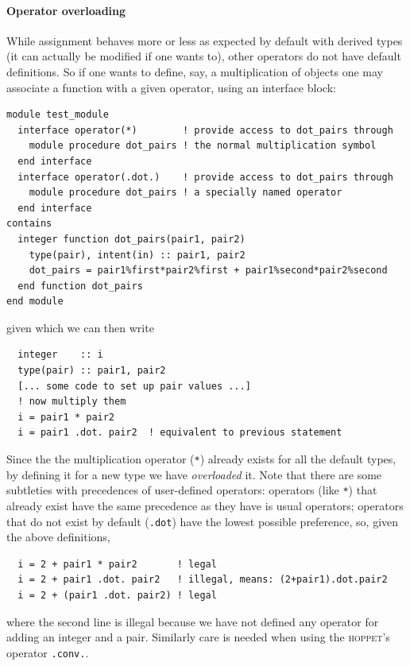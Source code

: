 \documentclass[12pt]{article}
\newcommand{\hoppet}{\textsc{hoppet}\xspace}
\begin{document}
\paragraph{Operator overloading} While assignment behaves more or less
as expected by default with derived types (it can actually be modified
if one wants to), other operators do not have default definitions. So
if one wants to define, say, a multiplication of objects one may
associate a function with a given operator, using an interface block:
\begin{lstlisting}
module test_module
  interface operator(*)        ! provide access to dot_pairs through 
    module procedure dot_pairs ! the normal multiplication symbol
  end interface 
  interface operator(.dot.)    ! provide access to dot_pairs through
    module procedure dot_pairs ! a specially named operator
  end interface 
contains
  integer function dot_pairs(pair1, pair2)
    type(pair), intent(in) :: pair1, pair2
    dot_pairs = pair1%first*pair2%first + pair1%second*pair2%second
  end function dot_pairs
end module
\end{lstlisting}
given which we can then write
\begin{lstlisting}
  integer    :: i
  type(pair) :: pair1, pair2
  [... some code to set up pair values ...]
  ! now multiply them
  i = pair1 * pair2
  i = pair1 .dot. pair2  ! equivalent to previous statement
\end{lstlisting}
Since the the multiplication operator (\texttt{*}) already exists for
all the default types, by defining it for a new type we have
\emph{overloaded} it. Note that there are some subtleties with
precedences of user-defined operators: operators (like \texttt{*})
that already exist have the same precedence as they have is usual
operators; operators that do not exist by default (\texttt{.dot}) have
the lowest possible preference, so, given the above definitions,
\begin{lstlisting}
  i = 2 + pair1 * pair2       ! legal
  i = 2 + pair1 .dot. pair2   ! illegal, means: (2+pair1).dot.pair2
  i = 2 + (pair1 .dot. pair2) ! legal
\end{lstlisting}
where the second line is illegal because we have not defined any
operator for adding an integer and a pair. Similarly care is needed
when using the \hoppet's operator \texttt{.conv.}.
\end{document}
